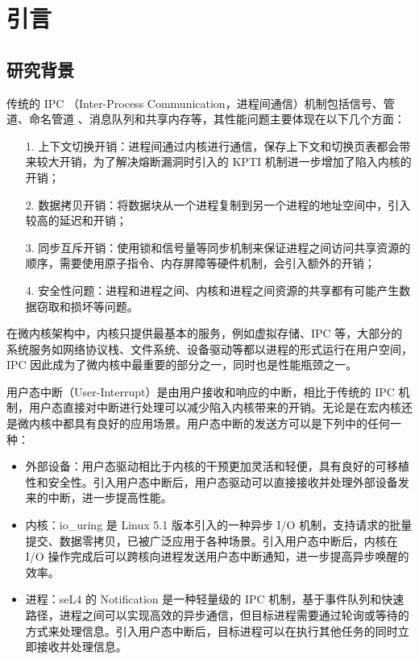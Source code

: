 
\chapter{引言}

\section{研究背景}

传统的 IPC （Inter-Process Communication，进程间通信）机制包括信号、管道、命名管道 、消息队列和共享内存等\cite{modernos}，其性能问题主要体现在以下几个方面：

\begin{itemize}
    \item[1.] 上下文切换开销：进程间通过内核进行通信，保存上下文和切换页表都会带来较大开销，为了解决熔断漏洞时引入的 KPTI 机制进一步增加了陷入内核的开销\cite{kpti}；
    \item[2.] 数据拷贝开销：将数据块从一个进程复制到另一个进程的地址空间中，引入较高的延迟和开销；
    \item[3.] 同步互斥开销：使用锁和信号量等同步机制来保证进程之间访问共享资源的顺序，需要使用原子指令、内存屏障等硬件机制，会引入额外的开销；
    \item[4.] 安全性问题：进程和进程之间、内核和进程之间资源的共享都有可能产生数据窃取和损坏等问题。
\end{itemize}

在微内核架构中，内核只提供最基本的服务，例如虚拟存储、IPC 等，大部分的系统服务如网络协议栈、文件系统、设备驱动等都以进程的形式运行在用户空间\cite{microkernel}，IPC 因此成为了微内核中最重要的部分之一，同时也是性能瓶颈之一。

用户态中断（User-Interrupt）是由用户接收和响应的中断，相比于传统的 IPC 机制，用户态直接对中断进行处理可以减少陷入内核带来的开销。无论是在宏内核还是微内核中都具有良好的应用场景。用户态中断的发送方可以是下列中的任何一种：

\begin{itemize}
    \item 外部设备：用户态驱动\cite{userdriver}相比于内核的干预更加灵活和轻便，具有良好的可移植性和安全性。引入用户态中断后，用户态驱动可以直接接收并处理外部设备发来的中断，进一步提高性能。
    \item 内核：io\_uring \cite{iouring}是 Linux 5.1 版本引入的一种异步 I/O 机制，支持请求的批量提交、数据零拷贝，已被广泛应用于各种场景。引入用户态中断后，内核在 I/O 操作完成后可以跨核向进程发送用户态中断通知，进一步提高异步唤醒的效率。
    \item 进程：seL4 的 Notification \cite{sel4}是一种轻量级的 IPC 机制，基于事件队列和快速路径，进程之间可以实现高效的异步通信，但目标进程需要通过轮询或等待的方式来处理信息。引入用户态中断后，目标进程可以在执行其他任务的同时立即接收并处理信息。
\end{itemize}

